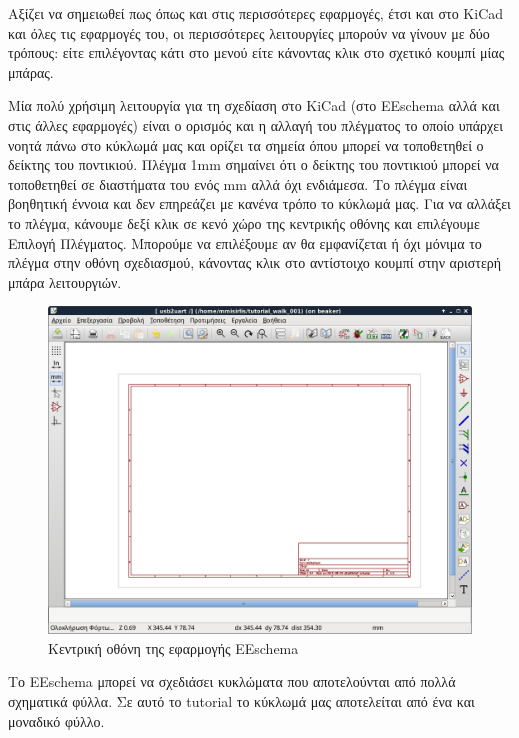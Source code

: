 \documentclass[a4paper]{article}
\begin{document}
Αξίζει να σημειωθεί πως όπως και στις περισσότερες εφαρμογές, έτσι και στο \textenglish{KiCad} και όλες τις εφαρμογές του, οι περισσότερες λειτουργίες μπορούν να γίνουν με δύο τρόπους: είτε επιλέγοντας κάτι στο μενού είτε κάνοντας κλικ στο σχετικό κουμπί μίας μπάρας.

Mία πολύ χρήσιμη λειτουργία για τη σχεδίαση στο \textenglish{KiCad} (στο \textenglish{EEschema} αλλά και στις άλλες εφαρμογές)  είναι ο ορισμός και η αλλαγή του πλέγματος το οποίο υπάρχει νοητά πάνω στο κύκλωμά μας και ορίζει τα σημεία όπου μπορεί να τοποθετηθεί ο δείκτης του ποντικιού. Πλέγμα 1mm σημαίνει ότι ο δείκτης του ποντικιού μπορεί να τοποθετηθεί σε διαστήματα του ενός mm αλλά όχι ενδιάμεσα. Το πλέγμα είναι βοηθητική έννοια και δεν επηρεάζει με κανένα τρόπο το κύκλωμά μας. Για να αλλάξει το πλέγμα, κάνουμε δεξί κλικ σε κενό χώρο της κεντρικής οθόνης και επιλέγουμε Επιλογή Πλέγματος. Μπορούμε να επιλέξουμε αν θα εμφανίζεται ή όχι μόνιμα το πλέγμα στην οθόνη σχεδιασμού, κάνοντας κλικ στο αντίστοιχο κουμπί στην αριστερή μπάρα λειτουργιών.

\begin{figure}
  \begin{center}
    \includegraphics[width=.9\textwidth]{img/eesch-main-window.png}
    \caption{Κεντρική οθόνη της εφαρμογής \textenglish{EEschema}}
    \label{fig:eesch-main-window}
  \end{center}
\end{figure}

Το \textenglish{EEschema} μπορεί να σχεδιάσει κυκλώματα που αποτελούνται από πολλά σχηματικά φύλλα. Σε αυτό το tutorial το κύκλωμά μας αποτελείται από ένα και μοναδικό φύλλο.
\end{document}
